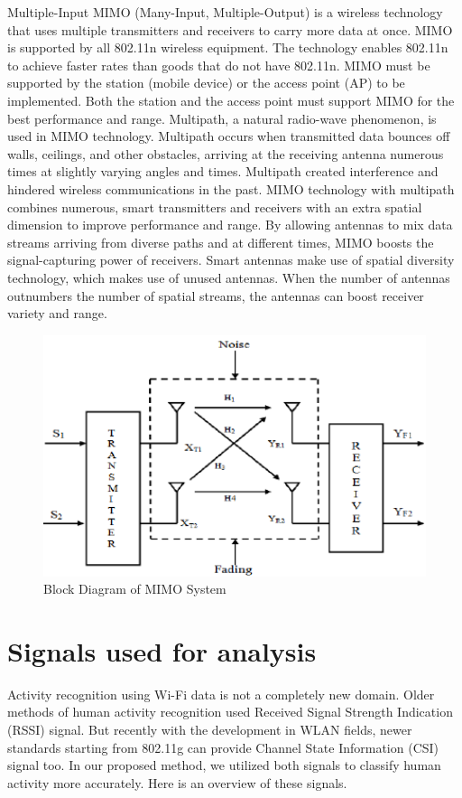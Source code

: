 Multiple-Input MIMO (Many-Input, Multiple-Output) is a wireless technology that uses multiple transmitters and receivers to carry more data at once. MIMO is supported by all 802.11n wireless equipment. The technology enables 802.11n to achieve faster rates than goods that do not have 802.11n.\cite{mimo}
MIMO must be supported by the station (mobile device) or the access point (AP) to be implemented. Both the station and the access point must support MIMO for the best performance and range.
Multipath, a natural radio-wave phenomenon, is used in MIMO technology. Multipath occurs when transmitted data bounces off walls, ceilings, and other obstacles, arriving at the receiving antenna numerous times at slightly varying angles and times. Multipath created interference and hindered wireless communications in the past. MIMO technology with multipath combines numerous, smart transmitters and receivers with an extra spatial dimension to improve performance and range.
By allowing antennas to mix data streams arriving from diverse paths and at different times, MIMO boosts the signal-capturing power of receivers. Smart antennas make use of spatial diversity technology, which makes use of unused antennas. When the number of antennas outnumbers the number of spatial streams, the antennas can boost receiver variety and range.\cite{CORVAJA2008288}

\begin{figure}[H]
\centering
\includegraphics[width=1.0\textwidth]{./figure/chap 3/mimo.png}
\caption{Block Diagram of MIMO System}
\label{Fig 3.4}
\end{figure}


\section{Signals used for analysis}
Activity recognition using Wi-Fi data is not a completely new domain. Older methods of human activity recognition used Received Signal Strength Indication (RSSI) signal. But recently with the development in WLAN fields, newer standards starting from 802.11g can provide Channel State Information (CSI) signal too. In our proposed method, we utilized both signals to classify human activity more accurately. Here is an overview of these signals.

